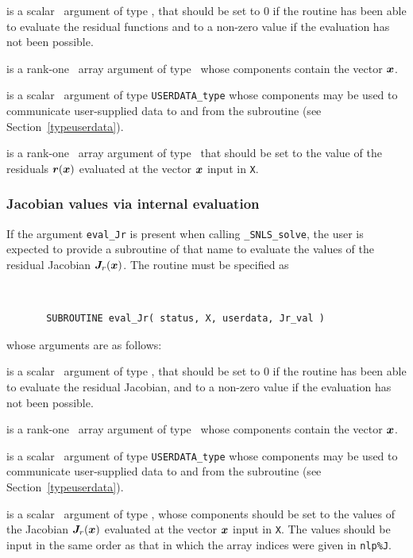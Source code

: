 \documentclass{galahad}
\newcommand{\packagename}{SNLS}
\newcommand{\fullpackagename}{\libraryname\_\packagename}
\newcommand{\solver}{{\tt \fullpackagename\_solve}}
\begin{document}
\begin{description}
 is a scalar \intentout\ argument of type \integer,
that should be set to 0 if the routine has been able to evaluate
the residual functions
and to a non-zero value if the evaluation has not been possible.

 is a rank-one \intentin\ array argument of type \realdp\
whose components contain the vector ${\bm{x}}$.

 is a scalar \intentinout\ argument of type
{\tt USERDATA\_type} whose components may be used
to communicate user-supplied data to and from the subroutine
(see Section~\ref{typeuserdata}).

 is a rank-one \intentout\ array argument of type \realdp\
that should be set to the value of the residuals ${\bm{r}}({\bm{x}})$
evaluated at the vector ${\bm{x}}$ input in {\tt X}.

\end{description}


\subsubsection{Jacobian values via internal evaluation\label{jfv}}

If the argument {\tt eval\_Jr} is present when calling \solver, the
user is expected to provide a subroutine of that name to evaluate the
values of the residual Jacobian ${\bm{J}}_r({\bm{x}})$.
The routine must be specified as

\def\baselinestretch{0.8}
{\tt
\begin{verbatim}
       SUBROUTINE eval_Jr( status, X, userdata, Jr_val )
\end{verbatim} }
\def\baselinestretch{1.0}
\noindent whose arguments are as follows:

\begin{description}
 is a scalar \intentout\ argument of type \integer,
that should be set to 0 if the routine has been able to evaluate
the residual Jacobian,
and to a non-zero value if the evaluation has not been possible.

\ittf{X} is a rank-one \intentin\ array argument of type \realdp\
whose components contain the vector ${\bm{x}}$.

\itt{userdata} is a scalar \intentinout\ argument of type
{\tt USERDATA\_type} whose components may be used
to communicate user-supplied data to and from the subroutine
(see Section~\ref{typeuserdata}).

\itt{Jr\_val} is a scalar \intentout\ argument of type \realdp,
whose components should be set to the values
of the Jacobian ${\bm{J}}_r({\bm{x}})$
evaluated at the vector ${\bm{x}}$ input in {\tt X}.
The values should
be input in the same order as that in which the array indices were
given in {\tt nlp\%J}.

\end{description}
\end{document}

